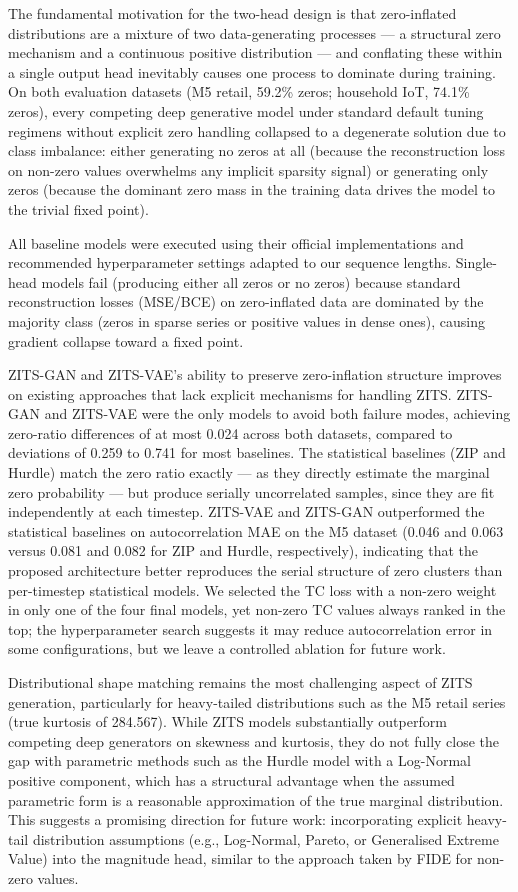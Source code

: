 \documentclass[make,article,submit,moreauthors]{Definitions/mdpi}
\begin{document}
The fundamental motivation for the two-head design is that zero-inflated distributions are a mixture of two data-generating processes — a structural zero mechanism and a continuous positive distribution — and conflating these within a single output head inevitably causes one process to dominate during training. On both evaluation datasets (M5 retail, 59.2\% zeros; household IoT, 74.1\% zeros), every competing deep generative model under standard default tuning regimens without explicit zero handling collapsed to a degenerate solution due to class imbalance: either generating no zeros at all (because the reconstruction loss on non-zero values overwhelms any implicit sparsity signal) or generating only zeros (because the dominant zero mass in the training data drives the model to the trivial fixed point). 

All baseline models were executed using their official implementations and recommended hyperparameter settings adapted to our sequence lengths. Single-head models fail (producing either all zeros or no zeros) because standard reconstruction losses (MSE/BCE) on zero-inflated data are dominated by the majority class (zeros in sparse series or positive values in dense ones), causing gradient collapse toward a fixed point. 

ZITS-GAN and ZITS-VAE's ability to preserve zero-inflation structure improves on existing approaches that lack explicit mechanisms for handling ZITS. ZITS-GAN and ZITS-VAE were the only models to avoid both failure modes, achieving zero-ratio differences of at most 0.024 across both datasets, compared to deviations of 0.259 to 0.741 for most baselines. The statistical baselines (ZIP and Hurdle) match the zero ratio exactly — as they directly estimate the marginal zero probability — but produce serially uncorrelated samples, since they are fit independently at each timestep. ZITS-VAE and ZITS-GAN outperformed the statistical baselines on autocorrelation MAE on the M5 dataset (0.046 and 0.063 versus 0.081 and 0.082 for ZIP and Hurdle, respectively), indicating that the proposed architecture better reproduces the serial structure of zero clusters than per-timestep statistical models. We selected the TC loss with a non-zero weight in only one of the four final models, yet non-zero TC values always ranked in the top; the hyperparameter search suggests it may reduce autocorrelation error in some configurations, but we leave a controlled ablation for future work.

Distributional shape matching remains the most challenging aspect of ZITS generation, particularly for heavy-tailed distributions such as the M5 retail series (true kurtosis of 284.567). While ZITS models substantially outperform competing deep generators on skewness and kurtosis, they do not fully close the gap with parametric methods such as the Hurdle model with a Log-Normal positive component, which has a structural advantage when the assumed parametric form is a reasonable approximation of the true marginal distribution. This suggests a promising direction for future work: incorporating explicit heavy-tail distribution assumptions (e.g., Log-Normal, Pareto, or Generalised Extreme Value) into the magnitude head, similar to the approach taken by FIDE for non-zero values.
\end{document}
